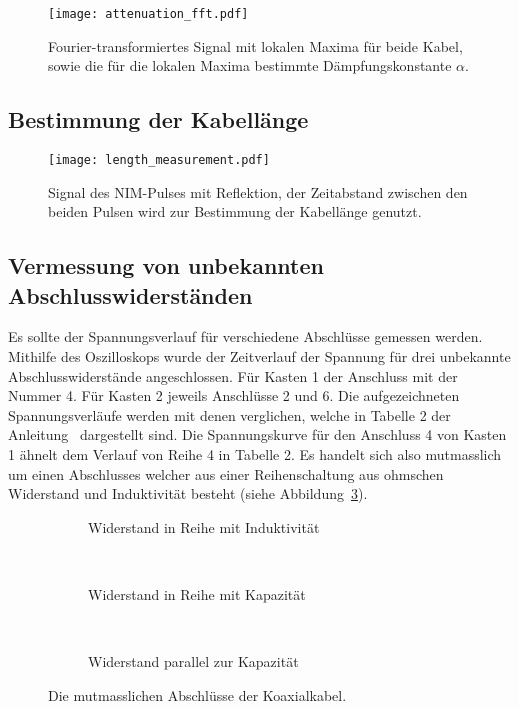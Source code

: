 \begin{figure}
  \centering
  \texttt{[image: attenuation\_fft.pdf]}
  \caption{%
    Fourier-transformiertes Signal mit lokalen Maxima für beide Kabel, sowie die für die lokalen Maxima bestimmte Dämpfungskonstante $α$.
  }\label{fig:attenuation_fft}
\end{figure}

\subsection{Bestimmung der Kabellänge}

\begin{figure}
  \centering
  \texttt{[image: length\_measurement.pdf]}
  \caption{%
    Signal des NIM-Pulses mit Reflektion, der Zeitabstand zwischen den beiden Pulsen wird zur Bestimmung der Kabellänge genutzt.
  }\label{fig:length}
\end{figure}

\subsection{Vermessung von unbekannten Abschlusswiderständen}
Es sollte der Spannungsverlauf für verschiedene Abschlüsse gemessen werden. Mithilfe des Oszilloskops wurde der Zeitverlauf der Spannung für
drei unbekannte Abschlusswiderstände angeschlossen. Für Kasten 1 der Anschluss mit der Nummer 4. Für Kasten 2 jeweils Anschlüsse 2 und 6.
Die aufgezeichneten Spannungsverläufe werden mit denen verglichen, welche in Tabelle 2 der Anleitung~\cite{anleitung} dargestellt sind.
Die Spannungskurve für den Anschluss 4 von Kasten 1 ähnelt dem Verlauf von Reihe 4 in Tabelle 2.
Es handelt sich also mutmasslich um einen Abschlusses welcher aus einer Reihenschaltung aus ohmschen Widerstand und Induktivität besteht (siehe
Abbildung~\ref{fig:end_1}).

\begin{figure}
    \centering
    \begin{subfigure}[b]{0.3\textwidth}
        
        \caption{Widerstand in Reihe mit Induktivität}
        \label{fig:end_1}
    \end{subfigure}
    ~ %
    \begin{subfigure}[b]{0.3\textwidth}
        
        \caption{Widerstand in Reihe mit Kapazität}
        \label{fig:end_2}
    \end{subfigure}
    ~ %
    \begin{subfigure}[b]{0.3\textwidth}
        
        \caption{Widerstand parallel zur Kapazität}
        \label{fig:end_3}
    \end{subfigure}
    \caption{Die mutmasslichen Abschlüsse der Koaxialkabel.}\label{fig:ends}
\end{figure}

